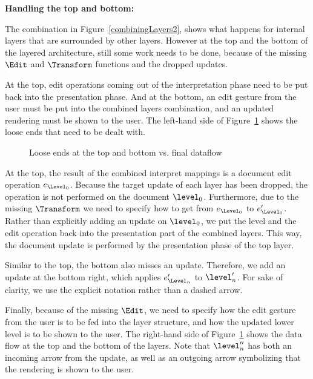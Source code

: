\bigskip
{\bf Handling the top and bottom:}

The combination in Figure~\ref{combiningLayers2}, shows what happens for internal layers that are surrounded by other layers. However at the top and the bottom of the layered architecture, still some work needs to be done, because of the missing $\Edit$ and $\Transform$ functions and the dropped updates. 

At the top, edit operations coming out of the interpretation phase need to be put back into the presentation phase. And at the bottom, an edit gesture from the user must be put into the combined layers combination, and an updated rendering must be shown to the user. The left-hand side of Figure~\ref{topAndBottom} shows the loose ends that need to be dealt with.

\begin{figure}\begin{center}\begin{center}
\end{center}
\caption{Loose ends at the top and bottom vs. final dataflow}\label{topAndBottom} 
\end{center}\end{figure}


At the top, the result of the combined interpret mappings is a document edit operation $e_{\Level_0}$. Because the target update of each layer has been dropped, the operation is not performed on the document $\level_0$. Furthermore, due to the missing $\Transform$ we need to specify how to get from $e_{\Level_0}$ to $e'_{\Level_0}$. Rather than explicitly adding an update on $\level_0$, we put the level and the edit operation back into the presentation part of the combined layers. This way, the document update is performed by the presentation phase of the top layer.

Similar to the top, the bottom also misses an update. Therefore, we add an update at the bottom right, which applies $e'_{\Level_n}$ to $\level'_n$. For sake of clarity, we use the explicit notation rather than a dashed arrow. 

Finally, because of the missing $\Edit$, we need to specify how the edit gesture from the user is to be fed into the layer structure, and how the updated lower level is to be shown to the user. The right-hand side of Figure~\ref{topAndBottom} shows the data flow at the top and the bottom of the layers. Note that $\level''_n$ has both an incoming arrow from the update, as well as an outgoing arrow symbolizing that the rendering is shown to the user.

